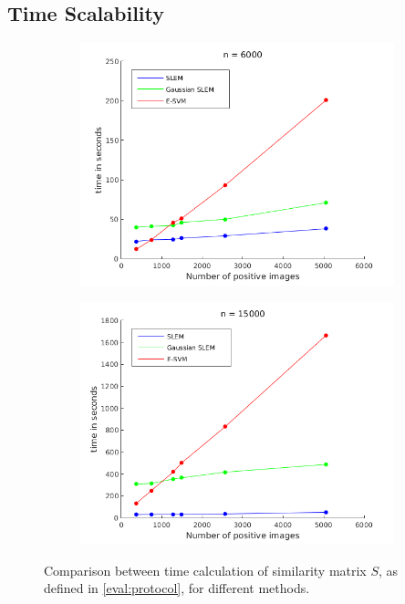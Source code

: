 \subsection{Time Scalability}
\begin{figure}[!h]
\centering
\begin{subfigure}[b]{0.48\textwidth}
\includegraphics[width=\textwidth]{speed_n_6K.png}
\end{subfigure}
\begin{subfigure}[b]{0.48\textwidth}
\includegraphics[width=\textwidth]{speed_n_15K.png}
\end{subfigure}
\caption{Comparison between time calculation of similarity matrix $S$, as defined in \ref{eval:protocol}, for different methods.}
\label{time:scalar}
\end{figure}




